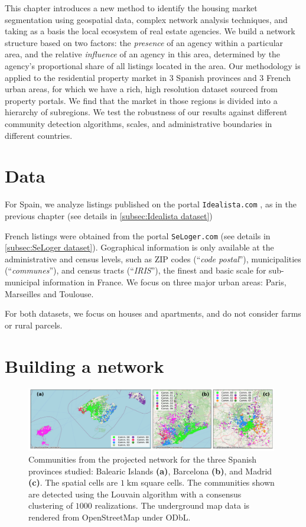 This chapter introduces a new method to identify the housing market segmentation using geospatial data, complex network analysis techniques, and taking as a basis the local ecosystem of real estate agencies. We build a network structure based on two factors:  the \textit{presence} of an agency within a particular area, and the relative \textit{influence} of an agency in this area, determined by the agency's proportional share of all listings located in the area. Our methodology is applied to the residential property market in 3 Spanish provinces and 3 French urban areas, for which we have a rich, high resolution dataset sourced from property portals. We find that the market in those regions is divided into a hierarchy of subregions. We test the robustness of our results against different community detection algorithms, scales, and administrative boundaries in different countries.

\section{Data}

For Spain, we analyze listings published on the portal \texttt{Idealista.com} \cite{idealista}, as in the previous chapter (see details in \ref{subsec:Idealista dataset})

French listings were obtained from the portal \texttt{SeLoger.com} \cite{SeLoger} (see details in \ref{subsec:SeLoger dataset}). Gographical information is only available at the administrative and census levels, such as ZIP codes (``\textit{code postal}''), municipalities (``\textit{communes}''), and census tracts (``\textit{IRIS}''), the finest and basic scale for sub-municipal information in France. We focus on three major urban areas: Paris, Marseilles and Toulouse. 

For both datasets, we focus on houses and apartments, and do not consider farms or rural parcels.

\section{Building a network \label{sec:materials_and_methods}}

\begin{figure}
    \centering
    \includegraphics[width = 0.98\textwidth]{Figs/Idealista_segmentation/Cell_communities.pdf}
    \caption[Market segmentation for $1 \; \textrm{km}$ square cells.]{ Communities from the projected network for the three Spanish provinces studied: Balearic Islands \textbf{(a)}, Barcelona \textbf{(b)}, and Madrid \textbf{(c)}. The spatial cells are $1 \; \textrm{km}$ square cells. The communities shown are detected using the Louvain algorithm with a consensus clustering of $1000$ realizations. The underground map data is rendered from OpenStreetMap under ODbL.\label{fig:cell_1000}}
\end{figure}

